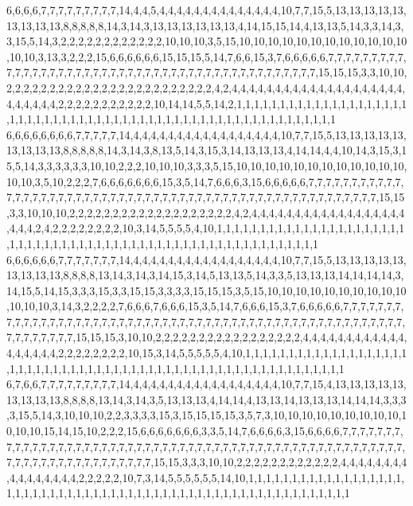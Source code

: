 6,6,6,6,7,7,7,7,7,7,7,7,7,14,4,4,5,4,4,4,4,4,4,4,4,4,4,4,4,4,4,10,7,7,15,5,13,13,13,13,13,13,13,13,13,8,8,8,8,8,14,3,14,3,13,13,13,13,13,13,4,14,15,15,14,4,13,13,5,14,3,3,14,3,3,15,5,14,3,2,2,2,2,2,2,2,2,2,2,2,2,10,10,10,3,5,15,10,10,10,10,10,10,10,10,10,10,10,10,10,10,3,13,3,2,2,2,15,6,6,6,6,6,6,15,15,15,5,14,7,6,6,15,3,7,6,6,6,6,6,7,7,7,7,7,7,7,7,7,7,7,7,7,7,7,7,7,7,7,7,7,7,7,7,7,7,7,7,7,7,7,7,7,7,7,7,7,7,7,7,7,7,7,7,7,15,15,15,3,3,10,10,2,2,2,2,2,2,2,2,2,2,2,2,2,2,2,2,2,2,2,2,2,2,2,2,4,2,4,4,4,4,4,4,4,4,4,4,4,4,4,4,4,4,4,4,4,4,4,4,4,4,4,4,2,2,2,2,2,2,2,2,2,2,2,10,14,14,5,5,14,2,1,1,1,1,1,1,1,1,1,1,1,1,1,1,1,1,1,1,1,1,1,1,1,1,1,1,1,1,1,1,1,1,1,1,1,1,1,1,1,1,1,1,1,1,1,1,1,1,1,1,1,1,1,1,1,1,1,1
6,6,6,6,6,6,6,6,7,7,7,7,7,14,4,4,4,4,4,4,4,4,4,4,4,4,4,4,4,4,4,10,7,7,15,5,13,13,13,13,13,13,13,13,13,8,8,8,8,8,14,3,14,3,8,13,5,14,3,15,3,14,13,13,13,4,14,14,4,4,10,14,3,15,3,15,5,14,3,3,3,3,3,3,10,10,2,2,2,10,10,10,3,3,3,5,15,10,10,10,10,10,10,10,10,10,10,10,10,10,10,3,5,10,2,2,2,7,6,6,6,6,6,6,6,15,3,5,14,7,6,6,6,3,15,6,6,6,6,6,7,7,7,7,7,7,7,7,7,7,7,7,7,7,7,7,7,7,7,7,7,7,7,7,7,7,7,7,7,7,7,7,7,7,7,7,7,7,7,7,7,7,7,7,7,7,7,7,7,7,7,7,7,7,15,15,3,3,10,10,10,2,2,2,2,2,2,2,2,2,2,2,2,2,2,2,2,2,2,2,4,2,4,4,4,4,4,4,4,4,4,4,4,4,4,4,4,4,4,4,4,4,4,2,4,2,2,2,2,2,2,2,2,10,3,14,5,5,5,5,4,10,1,1,1,1,1,1,1,1,1,1,1,1,1,1,1,1,1,1,1,1,1,1,1,1,1,1,1,1,1,1,1,1,1,1,1,1,1,1,1,1,1,1,1,1,1,1,1,1,1,1,1,1,1,1,1,1,1,1
6,6,6,6,6,6,7,7,7,7,7,7,7,14,4,4,4,4,4,4,4,4,4,4,4,4,4,4,4,4,4,10,7,7,15,5,13,13,13,13,13,13,13,13,13,8,8,8,8,13,14,3,14,3,14,15,3,14,5,13,13,5,14,3,3,5,13,13,13,14,14,14,14,3,14,15,5,14,15,3,3,3,15,3,3,15,15,3,3,3,3,15,15,15,3,5,15,10,10,10,10,10,10,10,10,10,10,10,10,10,3,14,3,2,2,2,2,7,6,6,6,7,6,6,6,15,3,5,14,7,6,6,6,15,3,7,6,6,6,6,6,7,7,7,7,7,7,7,7,7,7,7,7,7,7,7,7,7,7,7,7,7,7,7,7,7,7,7,7,7,7,7,7,7,7,7,7,7,7,7,7,7,7,7,7,7,7,7,7,7,7,7,7,7,7,7,7,7,7,7,7,7,15,15,15,3,10,10,2,2,2,2,2,2,2,2,2,2,2,2,2,2,2,2,2,4,4,4,4,4,4,4,4,4,4,4,4,4,4,4,4,4,4,2,2,2,2,2,2,2,2,10,15,3,14,5,5,5,5,5,4,10,1,1,1,1,1,1,1,1,1,1,1,1,1,1,1,1,1,1,1,1,1,1,1,1,1,1,1,1,1,1,1,1,1,1,1,1,1,1,1,1,1,1,1,1,1,1,1,1,1,1,1,1,1,1,1,1,1,1
6,7,6,6,7,7,7,7,7,7,7,7,7,14,4,4,4,4,4,4,4,4,4,4,4,4,4,4,4,4,4,10,7,7,15,4,13,13,13,13,13,13,13,13,13,8,8,8,8,13,14,3,14,3,5,13,13,13,4,14,14,4,13,13,14,13,13,13,14,14,14,3,3,3,3,15,5,14,3,10,10,10,2,2,3,3,3,3,15,3,15,15,15,15,3,5,7,3,10,10,10,10,10,10,10,10,10,10,10,10,15,14,15,10,2,2,2,15,6,6,6,6,6,6,6,3,3,5,14,7,6,6,6,6,3,15,6,6,6,6,7,7,7,7,7,7,7,7,7,7,7,7,7,7,7,7,7,7,7,7,7,7,7,7,7,7,7,7,7,7,7,7,7,7,7,7,7,7,7,7,7,7,7,7,7,7,7,7,7,7,7,7,7,7,7,7,7,7,7,7,7,7,7,7,7,7,7,7,7,7,15,15,3,3,3,10,10,2,2,2,2,2,2,2,2,2,2,2,2,4,4,4,4,4,4,4,4,4,4,4,4,4,4,4,4,2,2,2,2,2,10,7,3,14,5,5,5,5,5,5,14,10,1,1,1,1,1,1,1,1,1,1,1,1,1,1,1,1,1,1,1,1,1,1,1,1,1,1,1,1,1,1,1,1,1,1,1,1,1,1,1,1,1,1,1,1,1,1,1,1,1,1,1,1,1,1,1,1,1,1
